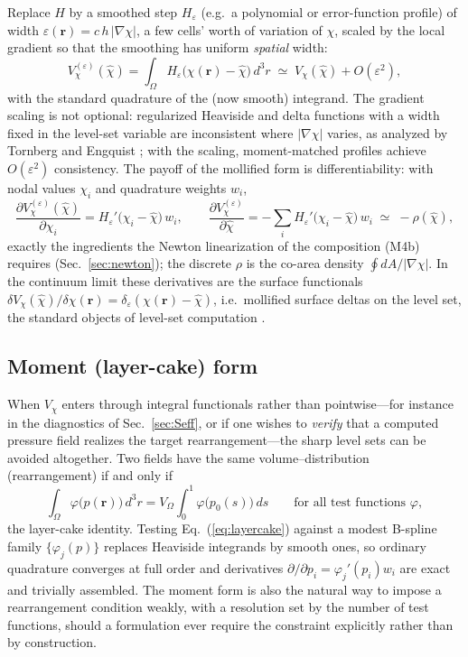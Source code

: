 \documentclass[english]{article}
\newcommand{\br}{\mathbf{r}}
\begin{document}
Replace $H$ by a smoothed step $H_\varepsilon$ (e.g.\ a polynomial or error-function profile) of
width $\varepsilon(\br)=c\,h\,|\nabla\chi|$, a few cells' worth of variation of $\chi$, scaled by
the local gradient so that the smoothing has uniform \emph{spatial} width:
\begin{equation}
V_\chi^{(\varepsilon)}(\hat\chi)=\int_\Omega H_\varepsilon\big(\chi(\br)-\hat\chi\big)\,d^3r
\;\simeq\;V_\chi(\hat\chi)+O(\varepsilon^{2}) ,
\label{eq:mollified_V}
\end{equation}
with the standard quadrature of the (now smooth) integrand. The gradient scaling is not optional:
regularized Heaviside and delta functions with a width fixed in the level-set variable are
inconsistent where $|\nabla\chi|$ varies, as analyzed by Tornberg and Engquist
\cite{tornberg2004}; with the scaling, moment-matched profiles achieve $O(\varepsilon^{2})$
consistency. The payoff of the mollified form is differentiability: with nodal values $\chi_i$
and quadrature weights $w_i$,
\begin{equation}
\frac{\partial V_\chi^{(\varepsilon)}(\hat\chi)}{\partial\chi_i}
=H_\varepsilon'\big(\chi_i-\hat\chi\big)\,w_i ,
\qquad
\frac{\partial V_\chi^{(\varepsilon)}}{\partial\hat\chi}
=-\sum_i H_\varepsilon'\big(\chi_i-\hat\chi\big)\,w_i\;\simeq\;-\rho(\hat\chi) ,
\label{eq:V_derivatives}
\end{equation}
exactly the ingredients the Newton linearization of the composition (M4b) requires
(Sec.~\ref{sec:newton}); the discrete $\rho$ is the co-area density
$\oint dA/|\nabla\chi|$. In the continuum limit these derivatives are the surface functionals
$\delta V_\chi(\hat\chi)/\delta\chi(\br)=\delta_\varepsilon(\chi(\br)-\hat\chi)$, i.e.\ mollified
surface deltas on the level set, the standard objects of level-set computation
\cite{osher_fedkiw}.

\subsection{Moment (layer-cake) form}
\label{sec:moments}

When $V_\chi$ enters through integral functionals rather than pointwise---for instance in the
diagnostics of Sec.~\ref{sec:Seff}, or if one wishes to \emph{verify} that a computed pressure
field realizes the target rearrangement---the sharp level sets can be avoided altogether. Two
fields have the same volume--distribution (rearrangement) if and only if
\begin{equation}
\int_\Omega\varphi\big(p(\br)\big)\,d^3r
=V_\Omega\int_0^1\varphi\big(p_0(s)\big)\,ds
\qquad\text{for all test functions }\varphi ,
\label{eq:layercake}
\end{equation}
the layer-cake identity. Testing Eq.~(\ref{eq:layercake}) against a modest B-spline family
$\{\varphi_j(p)\}$ replaces Heaviside integrands by smooth ones, so ordinary quadrature converges
at full order and derivatives $\partial/\partial p_i=\varphi_j'(p_i)w_i$ are exact and trivially
assembled. The moment form is also the natural way to impose a rearrangement condition weakly,
with a resolution set by the number of test functions, should a formulation ever require the
constraint explicitly rather than by construction.
\end{document}
